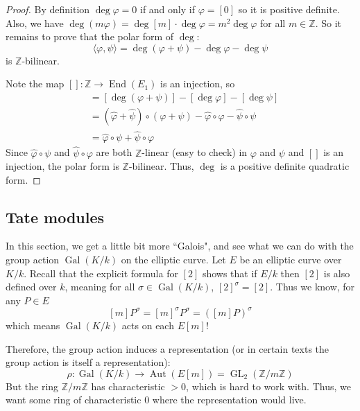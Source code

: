\documentclass[12pt]{article}
\theoremstyle{remark}
\theoremstyle{definition}
\newcommand{\s}[0]{\sigma}
\newcommand{\Z}[0]{\mathbb{Z}}
\newcommand{\Aut}[0]{\operatorname{Aut}}
\newcommand{\Gal}[0]{\operatorname{Gal}}
\newcommand{\End}[0]{\operatorname{End}}
\begin{document}
        \begin{proof}
            By definition $\deg\varphi=0$ if and only if $\varphi=[0]$ so it is positive definite. Also, we have $\deg(m\varphi)=\deg[m]\cdot\deg\varphi=m^2\deg\varphi$ for all $m\in\Z$. So it remains to prove that the polar form of $\deg$:
            \[\langle\varphi,\psi\rangle=\deg(\varphi+\psi)-\deg\varphi-\deg\psi\]
            is $\Z$-bilinear. 
            
            Note the map $[]:\Z\to\End(E_1)$ is an injection, so
            \begin{align*}
                [\langle\varphi,\psi\rangle]&=[\deg(\varphi+\psi)]-[\deg\varphi]-[\deg\psi]\\
                &=(\hat\varphi+\hat\psi)\circ(\varphi+\psi)-\hat\varphi\circ\varphi-\hat\psi\circ\psi\\
                &=\hat\varphi\circ\psi+\hat\psi\circ\varphi
            \end{align*}
            Since $\hat\varphi\circ\psi$ and $\hat\psi\circ\varphi$ are both $\Z$-linear (easy to check) in $\varphi$ and $\psi$ and $[]$ is an injection, the polar form is $\Z$-bilinear. Thus, $\deg$ is a positive definite quadratic form. 
        \end{proof}
        \subsection{Tate modules}
            In this section, we get a little bit more ``Galois", and see what we can do with the group action $\Gal(K/k)$ on the elliptic curve. Let $E$ be an elliptic curve over $K/k$. Recall that the explicit formula for $[2]$ shows that if $E/k$ then $[2]$ is also defined over $k$, meaning for all $\s\in\Gal(K/k)$, $[2]^\s=[2]$. Thus we know, for any $P\in E$
            \[[m]P^\s=[m]^\s P^\s=([m]P)^\s\]
            which means $\Gal(K/k)$ acts on each $E[m]$!
            
            Therefore, the group action induces a representation (or in certain texts the group action is itself a representation):
            \[\rho:\Gal(K/k)\to\Aut(E[m])=\operatorname{GL}_2(\Z/m\Z)\]
            But the ring $\Z/m\Z$ has characteristic $>0$, which is hard to work with. Thus, we want some ring of characteristic $0$ where the representation would live.
            
\end{document}
